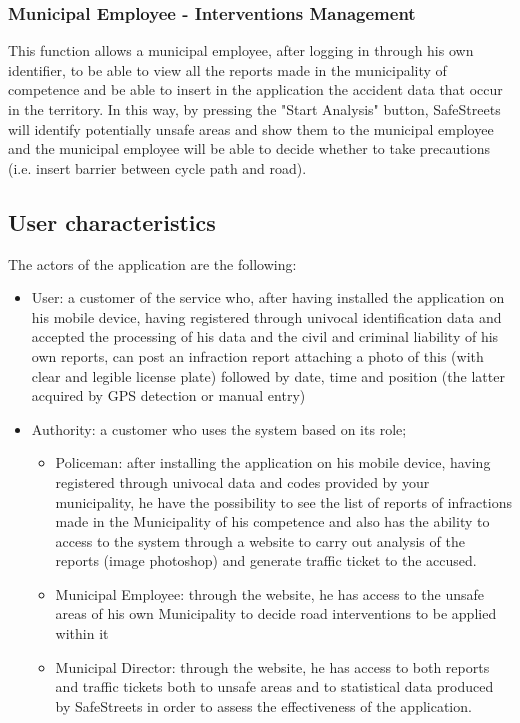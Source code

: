 \documentclass{article}
\begin{document}
    \subsubsection{Municipal Employee - Interventions Management}
    This function allows a municipal employee, after logging in through his own 
    identifier, to be able to view all the reports made in the municipality of 
    competence and be able to insert in the application the accident data that occur 
    in the territory. In this way, by pressing the "Start Analysis" button, SafeStreets 
    will identify potentially unsafe areas and show them to the municipal employee and 
    the municipal employee will be able to decide whether to take precautions 
    (i.e. insert barrier between cycle path and road).

\subsection{User characteristics}
The actors of the application are the following:
\begin{itemize}
    \item User: a customer of the service who, after having installed the application 
    on his mobile device, having registered through univocal identification data and 
    accepted the processing of his data and the civil and criminal liability of his own 
    reports, can post an infraction report attaching a photo of this (with clear and legible 
    license plate) followed by date, time and position (the latter acquired by GPS detection 
    or manual entry)
    \item Authority: a customer who uses the system based on its role;
    \begin{itemize}
        \item Policeman: after installing the application on his mobile device, having registered 
        through univocal data and codes provided by your municipality, he have the possibility 
        to see the list of reports of infractions made in the Municipality of his competence and 
        also has the ability to access to the system through a website to carry out analysis of 
        the reports (image photoshop) and generate traffic ticket to the accused.
        \item Municipal Employee: through the website, he has access to the unsafe areas of his own 
        Municipality to decide road interventions to be applied within it
        \item Municipal Director: through the website, he has access to both reports and traffic tickets 
        both to unsafe areas and to statistical data produced by SafeStreets in order to assess the 
        effectiveness of the application.
    \end{itemize}
\end{itemize}
\end{document}
